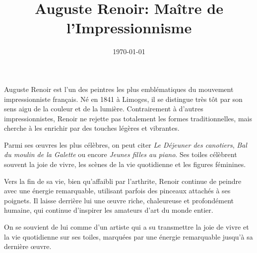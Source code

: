 \documentclass{article}
\title{Auguste Renoir: Maître de l’Impressionnisme}
\author{}
\date{\today}
\begin{document}
 
 
\maketitle

Auguste Renoir est l’un des peintres les plus emblématiques du mouvement impressionniste français. Né en 1841 à Limoges, il se distingue très tôt par son sens aigu de la couleur et de la lumière. Contrairement à d'autres impressionnistes, Renoir ne rejette pas totalement les formes traditionnelles, mais cherche à les enrichir par des touches légères et vibrantes. 

Parmi ses œuvres les plus célèbres, on peut citer \emph{Le Déjeuner des canotiers}, \emph{Bal du moulin de la Galette} ou encore \emph{Jeunes filles au piano}. Ses toiles célèbrent souvent la joie de vivre, les scènes de la vie quotidienne et les figures féminines.

Vers la fin de sa vie, bien qu'affaibli par l'arthrite, Renoir continue de peindre avec une énergie remarquable, utilisant parfois des pinceaux attachés à ses poignets. Il laisse derrière lui une œuvre riche, chaleureuse et profondément humaine, qui continue d’inspirer les amateurs d’art du monde entier.

On se souvient de lui comme d'un artiste qui a su transmettre la joie de vivre et la vie quotidienne sur ses toiles, marquées par une énergie remarquable jusqu’à sa dernière œuvre.
\end{document}
